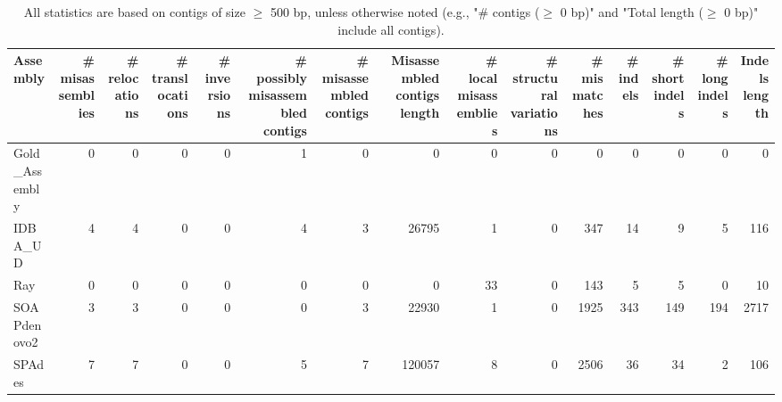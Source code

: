 \documentclass[12pt,a4paper]{article}
\begin{document}
\begin{table}[ht]
\begin{center}
\caption{All statistics are based on contigs of size $\geq$ 500 bp, unless otherwise noted (e.g., "\# contigs ($\geq$ 0 bp)" and "Total length ($\geq$ 0 bp)" include all contigs).}
\begin{tabular}{|l*{14}{|r}|}
\hline
Assembly & \# misassemblies &     \# relocations &     \# translocations &     \# inversions & \# possibly misassembled contigs & \# misassembled contigs & Misassembled contigs length & \# local misassemblies & \# structural variations & \# mismatches & \# indels &     \# short indels &     \# long indels & Indels length \\ \hline
Gold\_Assembly & 0 & 0 & 0 & 0 & 1 & 0 & 0 & 0 & 0 & 0 & 0 & 0 & 0 & 0 \\ \hline
IDBA\_UD & 4 & 4 & 0 & 0 & 4 & 3 & 26795 & 1 & 0 & 347 & 14 & 9 & 5 & 116 \\ \hline
Ray & 0 & 0 & 0 & 0 & 0 & 0 & 0 & 33 & 0 & 143 & 5 & 5 & 0 & 10 \\ \hline
SOAPdenovo2 & 3 & 3 & 0 & 0 & 0 & 3 & 22930 & 1 & 0 & 1925 & 343 & 149 & 194 & 2717 \\ \hline
SPAdes & 7 & 7 & 0 & 0 & 5 & 7 & 120057 & 8 & 0 & 2506 & 36 & 34 & 2 & 106 \\ \hline
\end{tabular}
\end{center}
\end{table}
\end{document}

